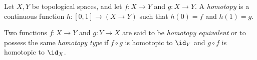 \documentclass{article}
\begin{document}
\begin{defn}[Homotopy]
Let $X, Y$ be topological spaces, and let $f : X \to Y$ and
$g : X \to Y$. A \emph{homotopy} is a continuous function
$h : [0,1] \to (X \to Y)$ such that $h(0) = f$ and $h(1) = g$.
\end{defn}

\begin{defn}
Two functions $f : X \to Y$ and $g : Y \to X$ are said to be
\emph{homotopy equivalent} or to possess the same \emph{homotopy type}
if $f \circ g$ is homotopic to $\id_Y$ and $g \circ f$ is homotopic to $\id_X$.
\end{defn}
\end{document}
